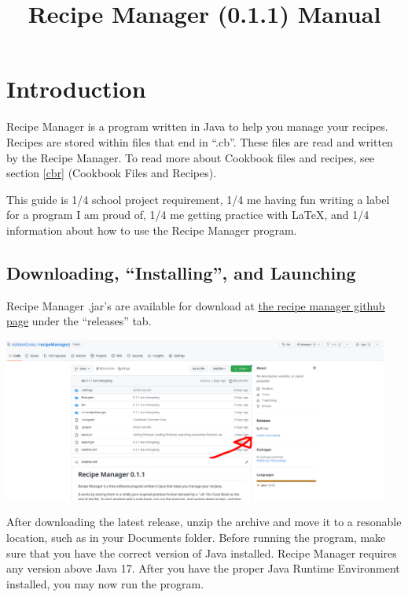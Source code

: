 \documentclass{article}
\title{Recipe Manager (0.1.1) Manual}
\author{}
\date{}
\begin{document}
\maketitle{}

\section{Introduction\label{intro}}

Recipe Manager is a program written in Java to help you manage your
recipes. Recipes are stored within files that end in ``.cb''. These
files are read and written by the Recipe Manager. To read more about
Cookbook files and recipes, see section \ref{cbr} (Cookbook Files and
Recipes).

This guide is 1/4 school project requirement, 1/4 me having fun
writing a label for a program I am proud of, 1/4 me getting practice
with \LaTeX{}, and 1/4 information about
how to use the Recipe Manager program.

\subsection{Downloading, ``Installing'', and Launching\label{downld}}

Recipe Manager .jar's are available for download at
\href{https://github.com/AshtonCross/recipeManagerJ}{the recipe
  manager github page} under the ``releases'' tab.

\begin{center}
\includegraphics[width=5in]{img/releases.png}
\end{center}

After downloading the latest release, unzip the archive and move it to
a resonable location, such as in your Documents folder. Before running
the program, make sure that you have the correct version of Java
installed. Recipe Manager requires any version above Java 17. After
you have the proper Java Runtime Environment installed, you may now
run the program. 
\end{document}
